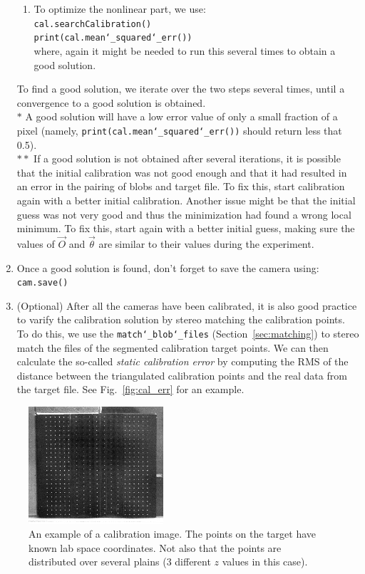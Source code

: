 \documentclass[10pt,a4paper]{article}
\begin{document}
\begin{enumerate}
\begin{enumerate}
		\item To optimize the nonlinear part, we use:\\[.5em]
		\texttt{cal.searchCalibration()}\\
		\texttt{print(cal.mean\char`_squared\char`_err())}\\[.5em]
		where, again it might be needed to run this several times to obtain a good solution.
	\end{enumerate}
	To find a good solution, we iterate over the two steps several times, until a convergence to a good solution is obtained.\\[1em] 
	$*$ A good solution will have a low error value of only a small fraction of a pixel (namely, \texttt{print(cal.mean\char`_squared\char`_err())} should return less that 0.5).\\[.5em]
	$**$ If a good solution is not obtained after several iterations, it is possible that the initial calibration was not good enough and that it had resulted in an error in the pairing of blobs and target file. To fix this, start calibration again with a better initial calibration. Another issue might be that the initial guess was not very good and thus the minimization had found a wrong local minimum. To fix this, start again with a better initial guess, making sure the values of $\vec{O}$ and $\vec{\theta}$ are similar to their values during the experiment.
	
	\item Once a good solution is found, don't forget to save the camera using:\\[.5em]
	\texttt{cam.save()}
	
	\item (Optional) After all the cameras have been calibrated, it is also good practice to varify the calibration solution by stereo matching the calibration points. To do this, we use the \texttt{match\char`_blob\char`_files} (Section~\ref{sec:matching}) to stereo match the files of the segmented calibration target points. We can then calculate the so-called \textit{static calibration error} by computing the RMS of the distance between the triangulated calibration points and the real data from the target file. See Fig.~\ref{fig:cal_err} for an example. 
\end{enumerate}


\begin{figure}
	\centering
	\includegraphics[width=5cm]{cal_image.jpg}
	\caption{An example of a calibration image. The points on the target have known lab space coordinates. Not also that the points are distributed over several plains (3 different $z$ values in this case). \label{fig:cal_img}}
\end{figure}
\end{document}
